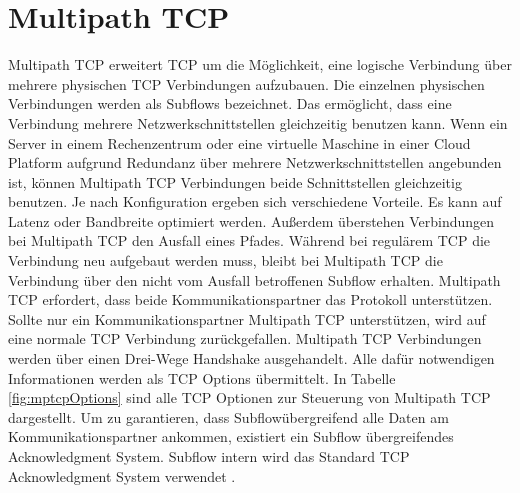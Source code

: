 \documentclass[a4paper, 12pt]{article}
\begin{document}
\section{Multipath TCP}
Multipath TCP erweitert TCP um die Möglichkeit, eine logische Verbindung über mehrere physischen TCP Verbindungen aufzubauen.
Die einzelnen physischen Verbindungen werden als Subflows bezeichnet.
Das ermöglicht, dass eine Verbindung mehrere Netzwerkschnittstellen gleichzeitig benutzen kann.
Wenn ein Server in einem Rechenzentrum oder eine virtuelle Maschine in einer Cloud Platform aufgrund Redundanz über mehrere Netzwerkschnittstellen angebunden ist, können Multipath TCP Verbindungen beide Schnittstellen gleichzeitig benutzen. 
Je nach Konfiguration ergeben sich verschiedene Vorteile. Es kann auf Latenz oder Bandbreite optimiert werden.
Außerdem überstehen Verbindungen bei Multipath TCP den Ausfall eines Pfades. Während bei regulärem TCP die Verbindung neu aufgebaut werden muss, bleibt bei Multipath TCP die Verbindung über den nicht vom Ausfall betroffenen Subflow erhalten.
Multipath TCP erfordert, dass beide Kommunikationspartner das Protokoll unterstützen. 
Sollte nur ein Kommunikationspartner Multipath TCP unterstützen, wird auf eine normale TCP Verbindung zurückgefallen.
Multipath TCP Verbindungen werden über einen Drei-Wege Handshake ausgehandelt.
Alle dafür notwendigen Informationen werden als TCP Options übermittelt. In Tabelle \ref{fig:mptcpOptions} sind alle TCP Optionen zur Steuerung von Multipath TCP dargestellt.
Um zu garantieren, dass Subflowübergreifend alle Daten am Kommunikationspartner ankommen, existiert ein Subflow übergreifendes
Acknowledgment System. Subflow intern wird das Standard TCP Acknowledgment System verwendet \cite{ford2013rfc}.
\end{document}
